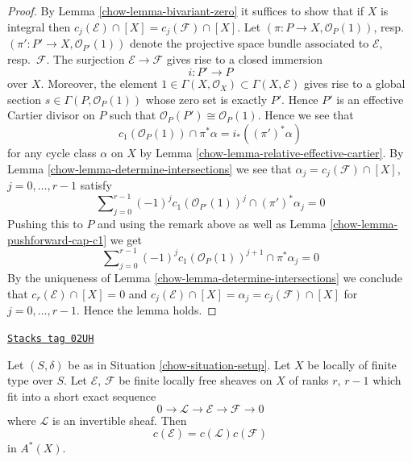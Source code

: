 \begin{proof}

By Lemma \ref{chow-lemma-bivariant-zero}
it suffices to show that if $X$ is integral
then $c_j(\mathcal{E}) \cap [X] = c_j(\mathcal{F}) \cap [X]$.
Let $(\pi : P \to X, \mathcal{O}_P(1))$,
resp.\ $(\pi' : P' \to X, \mathcal{O}_{P'}(1))$ denote the
projective space bundle associated to $\mathcal{E}$, resp.\ $\mathcal{F}$.
The surjection $\mathcal{E} \to \mathcal{F}$ gives rise
to a closed immersion
$$
i : P' \longrightarrow P
$$
over $X$. Moreover, the element
$1 \in \Gamma(X, \mathcal{O}_X) \subset \Gamma(X, \mathcal{E})$
gives rise to a global section $s \in \Gamma(P, \mathcal{O}_P(1))$
whose zero set is exactly $P'$. Hence $P'$ is an effective Cartier
divisor on $P$ such that $\mathcal{O}_P(P') \cong \mathcal{O}_P(1)$.
Hence we see that
$$
c_1(\mathcal{O}_P(1)) \cap \pi^*\alpha = i_*((\pi')^*\alpha)
$$
for any cycle class $\alpha$ on $X$ by
Lemma \ref{chow-lemma-relative-effective-cartier}.
By Lemma \ref{chow-lemma-determine-intersections} we see that
$\alpha_j = c_j(\mathcal{F}) \cap [X]$, $j = 0, \ldots, r - 1$
satisfy
$$
\sum\nolimits_{j = 0}^{r - 1} (-1)^jc_1(\mathcal{O}_{P'}(1))^j
\cap (\pi')^*\alpha_j = 0
$$
Pushing this to $P$ and using the remark above as well as
Lemma \ref{chow-lemma-pushforward-cap-c1} we get
$$
\sum\nolimits_{j = 0}^{r - 1}
(-1)^j c_1(\mathcal{O}_P(1))^{j + 1}
\cap \pi^*\alpha_j = 0
$$
By the uniqueness of Lemma \ref{chow-lemma-determine-intersections}
we conclude that
$c_r(\mathcal{E}) \cap [X] = 0$ and
$c_j(\mathcal{E}) \cap [X] = \alpha_j = c_j(\mathcal{F}) \cap [X]$
for $j = 0, \ldots, r - 1$. Hence the lemma holds.
\end{proof}

\begin{lemma}
\label{chow-lemma-additivity-invertible-subsheaf}
\href{https://stacks.math.columbia.edu/tag/02UH}{\texttt{Stacks tag 02UH}}

Let $(S, \delta)$ be as in Situation \ref{chow-situation-setup}.
Let $X$ be locally of finite type over $S$.
Let $\mathcal{E}$, $\mathcal{F}$ be finite locally free sheaves
on $X$ of ranks $r$, $r - 1$ which fit into a short
exact sequence
$$
0 \to \mathcal{L} \to \mathcal{E} \to \mathcal{F} \to 0
$$
where $\mathcal{L}$ is an invertible sheaf.
Then
$$
c(\mathcal{E}) = c(\mathcal{L}) c(\mathcal{F})
$$
in $A^*(X)$.
\end{lemma}

